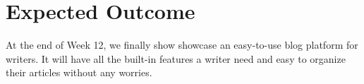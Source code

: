 \documentclass{article}
\begin{document}
\noindent \section{Expected Outcome}

\noindent At the end of Week 12, we finally show showcase an easy-to-use blog platform for writers. It will have all the built-in features a writer need and easy to organize their articles without any worries.
\end{document}
